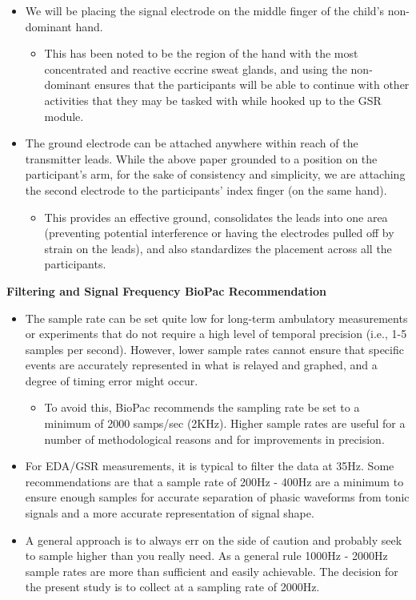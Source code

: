 \documentclass[
]{book}
\providecommand{\tightlist}{%
  \setlength{\itemsep}{0pt}\setlength{\parskip}{0pt}}
\begin{document}
\begin{itemize}
\tightlist
\item
  We will be placing the signal electrode on the middle finger of the child's non-dominant hand.

  \begin{itemize}
  \tightlist
  \item
    This has been noted to be the region of the hand with the most concentrated and reactive eccrine sweat glands, and using the non-dominant ensures that the participants will be able to continue with other activities that they may be tasked with while hooked up to the GSR module.
  \end{itemize}
\item
  The ground electrode can be attached anywhere within reach of the transmitter leads. While the above paper grounded to a position on the participant's arm, for the sake of consistency and simplicity, we are attaching the second electrode to the participants' index finger (on the same hand).

  \begin{itemize}
  \tightlist
  \item
    This provides an effective ground, consolidates the leads into one area (preventing potential interference or having the electrodes pulled off by strain on the leads), and also standardizes the placement across all the participants.
  \end{itemize}
\end{itemize}

\textbf{Filtering and Signal Frequency BioPac Recommendation}

\begin{itemize}
\tightlist
\item
  The sample rate can be set quite low for long-term ambulatory measurements or experiments that do not require a high level of temporal precision (i.e., 1-5 samples per second). However, lower sample rates cannot ensure that specific events are accurately represented in what is relayed and graphed, and a degree of timing error might occur.

  \begin{itemize}
  \tightlist
  \item
    To avoid this, BioPac recommends the sampling rate be set to a minimum of 2000 samps/sec (2KHz). Higher sample rates are useful for a number of methodological reasons and for improvements in precision.
  \end{itemize}
\item
  For EDA/GSR measurements, it is typical to filter the data at 35Hz. Some recommendations are that a sample rate of 200Hz - 400Hz are a minimum to ensure enough samples for accurate separation of phasic waveforms from tonic signals and a more accurate representation of signal shape.
\item
  A general approach is to always err on the side of caution and probably seek to sample higher than you really need. As a general rule 1000Hz - 2000Hz sample rates are more than sufficient and easily achievable. The decision for the present study is to collect at a sampling rate of 2000Hz.
\end{itemize}
\end{document}
